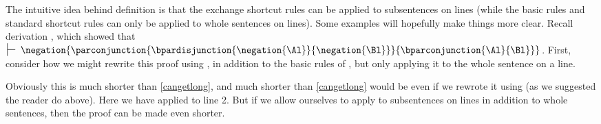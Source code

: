 \bigskip
\noindent{}The intuitive idea behind definition  is that the exchange shortcut rules can be applied to subsentences on lines (while the basic rules and standard shortcut rules can only be applied to whole sentences on lines). 
Some examples will hopefully make things more clear. 
Recall derivation , which showed that \mbox{$\sststile{}{}\;\negation{\parconjunction{\bpardisjunction{\negation{\Al}}{\negation{\Bl}}}{\bparconjunction{\Al}{\Bl}}}$}. 
First, consider how we might rewrite this proof using , in addition to the basic rules of \GSD{}, but only applying it to the whole sentence on a line. 
\begin{gproof}[\label{cangetlong2}]
\end{gproof}
Obviously this is much shorter than \ref{cangetlong}, and much shorter than \ref{cangetlong} would be even if we rewrote it using  (as we suggested the reader do above).
Here we have applied  to line 2. 
But if we allow ourselves to apply  to subsentences on lines in addition to whole sentences, then the proof can be made even shorter. 
\begin{gproof}[\label{cangetlong3}]
\end{gproof}
